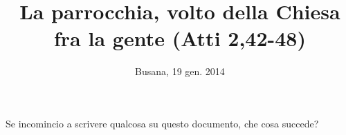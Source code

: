 \documentclass[a4paper,12pt,article,oneside]{memoir} %
\title{La parrocchia, volto della Chiesa fra la gente (Atti 2,42-48)}
\author{}
\date{Busana, 19 gen. 2014}
\begin{document}
\maketitle
\thispagestyle{empty}

Se incomincio a scrivere qualcosa su questo documento, che cosa succede?
\end{document}
